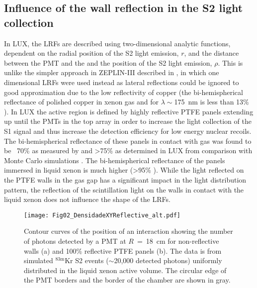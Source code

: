 \documentclass[a4paper,11pt]{article}
\begin{document}
\subsection{Influence of the wall reflection in the S2 light collection}

In LUX, the LRFs are described using two-dimensional analytic functions, dependent on the radial position of the S2 light emission, $r$, and the distance between the PMT and the and the position of the S2 light emission, $\rho$. This is unlike the simpler approach in ZEPLIN-III described in \cite{Solovov2011_PositionReconstruction}, in which one dimensional LRFs were used instead as lateral reflections could be ignored to good approximation due to the low reflectivity of copper (the bi-hemispherical reflectance \cite{nicodemus} of polished copper in xenon gas and for $\lambda\sim$175~nm is less than 13\% \cite{Claudio2007}). In LUX the active region is defined by highly reflective PTFE panels extending up until the PMTs in the top array in order to increase the light collection of the S1 signal and thus increase the detection efficiency for low energy nuclear recoils. The bi-hemispherical reflectance of these panels in contact with gas was found to be ~70\% as measured by \cite{silva:064902} and >75\% as determined in LUX from comparison with Monte Carlo simulations \cite{LUX2015_ReanalysisPRD}. The bi-hemispherical reflectance of the panels immersed in liquid xenon is much higher (>95\% \cite{FranciscoNeves2017_Reflectancia}). While the light reflected on the PTFE walls in the gas gap has a significant impact in the light distribution pattern, the reflection of the scintillation light on the walls in contact with the liquid xenon does not influence the shape of the LRFs.

\begin{figure}
 \begin{center}
\texttt{[image: Fig02\_DensidadeXYReflective\_alt.pdf]}
\caption{Contour curves of the position of an interaction showing the number of photons detected by a PMT at $R$~=~18~cm  for non-reflective walls (a) and  100\% reflective PTFE panels (b). The data is from simulated ${}^{\mathrm{83m}}$Kr S2 events ($\sim$20,000 detected photons) uniformly distributed in the liquid xenon active volume.
The circular edge of the PMT borders and the border of the chamber are shown in gray.}

\label{Fig03_A_DensidadeXYReflective}
 \end{center}
\end{figure}
\end{document}

